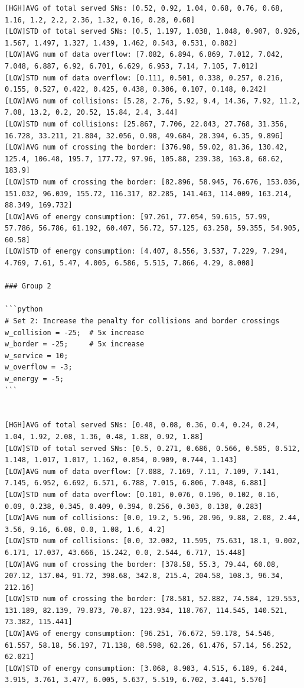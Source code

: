 \documentclass{article}
\begin{document}
\begin{verbatim}
[HGH]AVG of total served SNs: [0.52, 0.92, 1.04, 0.68, 0.76, 0.68, 1.16, 1.2, 2.2, 2.36, 1.32, 0.16, 0.28, 0.68]
[LOW]STD of total served SNs: [0.5, 1.197, 1.038, 1.048, 0.907, 0.926, 1.567, 1.497, 1.327, 1.439, 1.462, 0.543, 0.531, 0.882]
[LOW]AVG num of data overflow: [7.082, 6.894, 6.869, 7.012, 7.042, 7.048, 6.887, 6.92, 6.701, 6.629, 6.953, 7.14, 7.105, 7.012]
[LOW]STD num of data overflow: [0.111, 0.501, 0.338, 0.257, 0.216, 0.155, 0.527, 0.422, 0.425, 0.438, 0.306, 0.107, 0.148, 0.242]
[LOW]AVG num of collisions: [5.28, 2.76, 5.92, 9.4, 14.36, 7.92, 11.2, 7.08, 13.2, 0.2, 20.52, 15.84, 2.4, 3.44]
[LOW]STD num of collisions: [25.867, 7.706, 22.043, 27.768, 31.356, 16.728, 33.211, 21.804, 32.056, 0.98, 49.684, 28.394, 6.35, 9.896]
[LOW]AVG num of crossing the border: [376.98, 59.02, 81.36, 130.42, 125.4, 106.48, 195.7, 177.72, 97.96, 105.88, 239.38, 163.8, 68.62, 183.9]
[LOW]STD num of crossing the border: [82.896, 58.945, 76.676, 153.036, 151.032, 96.039, 155.72, 116.317, 82.285, 141.463, 114.009, 163.214, 88.349, 169.732]
[LOW]AVG of energy consumption: [97.261, 77.054, 59.615, 57.99, 57.786, 56.786, 61.192, 60.407, 56.72, 57.125, 63.258, 59.355, 54.905, 60.58]
[LOW]STD of energy consumption: [4.407, 8.556, 3.537, 7.229, 7.294, 4.769, 7.61, 5.47, 4.005, 6.586, 5.515, 7.866, 4.29, 8.008]

### Group 2

```python
# Set 2: Increase the penalty for collisions and border crossings
w_collision = -25;  # 5x increase
w_border = -25;     # 5x increase
w_service = 10;
w_overflow = -3;
w_energy = -5;
```


[HGH]AVG of total served SNs: [0.48, 0.08, 0.36, 0.4, 0.24, 0.24, 1.04, 1.92, 2.08, 1.36, 0.48, 1.88, 0.92, 1.88]
[LOW]STD of total served SNs: [0.5, 0.271, 0.686, 0.566, 0.585, 0.512, 1.148, 1.017, 1.017, 1.162, 0.854, 0.909, 0.744, 1.143]
[LOW]AVG num of data overflow: [7.088, 7.169, 7.11, 7.109, 7.141, 7.145, 6.952, 6.692, 6.571, 6.788, 7.015, 6.806, 7.048, 6.881]
[LOW]STD num of data overflow: [0.101, 0.076, 0.196, 0.102, 0.16, 0.09, 0.238, 0.345, 0.409, 0.394, 0.256, 0.303, 0.138, 0.283]
[LOW]AVG num of collisions: [0.0, 19.2, 5.96, 20.96, 9.88, 2.08, 2.44, 3.56, 9.16, 6.08, 0.0, 1.08, 1.6, 4.2]
[LOW]STD num of collisions: [0.0, 32.002, 11.595, 75.631, 18.1, 9.002, 6.171, 17.037, 43.666, 15.242, 0.0, 2.544, 6.717, 15.448]
[LOW]AVG num of crossing the border: [378.58, 55.3, 79.44, 60.08, 207.12, 137.04, 91.72, 398.68, 342.8, 215.4, 204.58, 108.3, 96.34, 212.16]
[LOW]STD num of crossing the border: [78.581, 52.882, 74.584, 129.553, 131.189, 82.139, 79.873, 70.87, 123.934, 118.767, 114.545, 140.521, 73.382, 115.441]
[LOW]AVG of energy consumption: [96.251, 76.672, 59.178, 54.546, 61.557, 58.18, 56.197, 71.138, 68.598, 62.26, 61.476, 57.14, 56.252, 62.021]
[LOW]STD of energy consumption: [3.068, 8.903, 4.515, 6.189, 6.244, 3.915, 3.761, 3.477, 6.005, 5.637, 5.519, 6.702, 3.441, 5.576]


\end{verbatim}
\end{document}
